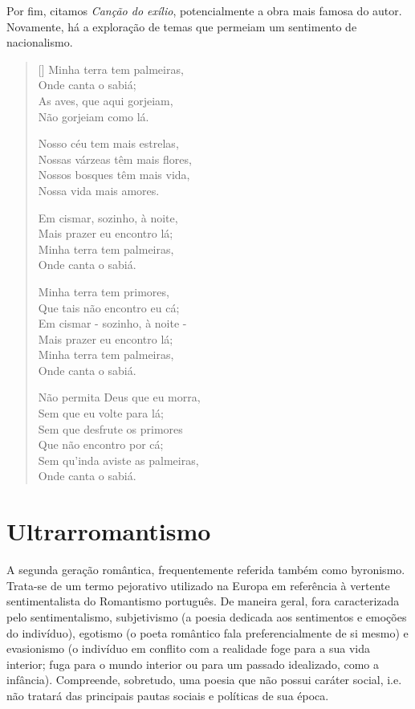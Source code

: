 Por fim, citamos \textit{Canção do exílio}, potencialmente a obra mais famosa do autor. Novamente, há a exploração de temas que permeiam um sentimento de nacionalismo.

\begin{verse}[\versewidth]
Minha terra tem palmeiras, \\
Onde canta o sabiá; \\
As aves, que aqui gorjeiam, \\
Não gorjeiam como lá.
						
Nosso céu tem mais estrelas, \\
Nossas várzeas têm mais flores, \\
Nossos bosques têm mais vida, \\
Nossa vida mais amores.
					
Em cismar, sozinho, à noite, \\
Mais prazer eu encontro lá; \\
Minha terra tem palmeiras, \\
Onde canta o sabiá.
					
Minha terra tem primores, \\
Que tais não encontro eu cá; \\
Em cismar - sozinho, à noite - \\
Mais prazer eu encontro lá; \\
Minha terra tem palmeiras, \\
Onde canta o sabiá.
					
Não permita Deus que eu morra, \\
Sem que eu volte para lá; \\
Sem que desfrute os primores \\
Que não encontro por cá; \\
Sem qu'inda aviste as palmeiras, \\
Onde canta o sabiá.
\end{verse}

\section{Ultrarromantismo}

A segunda geração romântica, frequentemente referida também como byronismo. Trata-se de um termo pejorativo utilizado na Europa em referência à vertente sentimentalista do Romantismo português. De maneira geral, fora caracterizada pelo sentimentalismo, subjetivismo (a poesia dedicada aos sentimentos e emoções do indivíduo), egotismo (o poeta romântico fala preferencialmente de si mesmo) e  evasionismo (o indivíduo em conflito com a realidade foge para a sua vida interior; fuga para o mundo interior ou para um passado idealizado, como a infância). Compreende, sobretudo, uma poesia que não possui caráter social, i.e. não tratará das principais pautas sociais e políticas de sua época.

